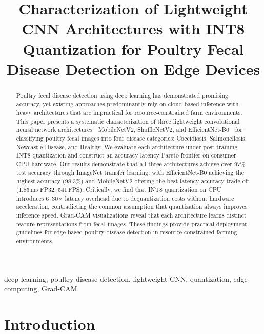 \documentclass[conference,a4paper]{IEEEtran}
\begin{document}
\title{Characterization of Lightweight CNN Architectures with INT8 Quantization for Poultry Fecal Disease Detection on Edge Devices}

\author{
}

\maketitle

\begin{abstract}
Poultry fecal disease detection using deep learning has demonstrated promising accuracy, yet existing approaches predominantly rely on cloud-based inference with heavy architectures that are impractical for resource-constrained farm environments. This paper presents a systematic characterization of three lightweight convolutional neural network architectures---MobileNetV2, ShuffleNetV2, and EfficientNet-B0---for classifying poultry fecal images into four disease categories: Coccidiosis, Salmonellosis, Newcastle Disease, and Healthy. We evaluate each architecture under post-training INT8 quantization and construct an accuracy-latency Pareto frontier on consumer CPU hardware. Our results demonstrate that all three architectures achieve over 97\% test accuracy through ImageNet transfer learning, with EfficientNet-B0 achieving the highest accuracy (98.3\%) and MobileNetV2 offering the best latency-accuracy trade-off (1.85\,ms FP32, 541\,FPS). Critically, we find that INT8 quantization on CPU introduces 6--30$\times$ latency overhead due to dequantization costs without hardware acceleration, contradicting the common assumption that quantization always improves inference speed. Grad-CAM visualizations reveal that each architecture learns distinct feature representations from fecal images. These findings provide practical deployment guidelines for edge-based poultry disease detection in resource-constrained farming environments.
\end{abstract}

\begin{IEEEkeywords}
deep learning, poultry disease detection, lightweight CNN, quantization, edge computing, Grad-CAM
\end{IEEEkeywords}

\section{Introduction}
\end{document}
